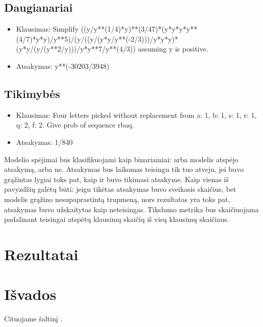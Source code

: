 \documentclass[conference]{IEEEtran}
\begin{document}
\subsection{Daugianariai}
\begin{itemize}
    \item Klausimas: Simplify ((y/y**(1/4)*y)**(3/47)*(y*y*y*y**(4/7)*y*y)/y**5)/(y/((y/(y*y/y**(-2/3)))/y*y*y)*(y*y/(y/(y**2/y)))/y*y**7/y**(4/3)) assuming y is positive.
    \item Atsakymas: y**(-30203/3948)
\end{itemize}
\subsection{Tikimybės}
\begin{itemize}
    \item Klausimas: Four letters picked without replacement from {a: 1, b: 1, s: 1, r: 1, q: 2, f: 2}. Give prob of sequence rbaq.
    \item Atsakymas: 1/840
\end{itemize}

Modelio spėjimai bus klasifikuojami kaip binariainiai: arba modelis atspėjo atsakymą, arba ne.
Atsakymas bus laikomas teisingu tik tuo atveju, jei buvo grąžintas lygiai toks pat, kaip ir buvo tikimasi atsakyme.
Kaip vienas iš pavyzdžių galėtų būti: jeigu tikėtas atsakymas buvo sveikasis skaičius, bet modelis grąžino
nesupaprastintą trupmeną, nors rezultatas yra toks pat, atsakymas buvo užskaitytas kaip neteisingas.
Tikslumo metrika bus skaičiuojama padalinant teisingai atspėtų klausimų skaičių iš visų klausimų skaičiaus.

\section{Rezultatai}

\section{Išvados}


Cituojame šaltinį \cite{deeplab}.



\end{document}
